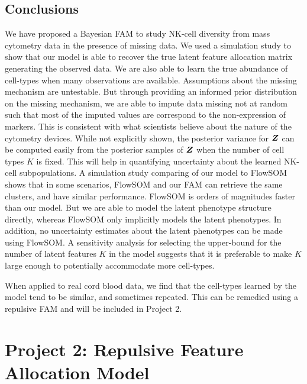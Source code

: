 \documentclass[12pt,]{article}
\newcommand{\bZ}{\mbox{\boldmath $Z$}}
\begin{document}
\subsection{Conclusions}\label{sec:CB-conc}


We have proposed a Bayesian FAM to study NK-cell diversity from mass cytometry
data in the presence of missing data. We used a simulation study to show that
our model is able to recover the true latent feature allocation matrix
generating the observed data. We are also able to learn the true abundance of
cell-types when many observations are available. 
%
Assumptions about the missing mechanism are untestable. But through providing
an informed prior distribution on the missing mechanism, we are able to impute
data missing not at random such that most of the imputed values are correspond
to the non-expression of markers. This is consistent with what scientists
believe about the nature of the cytometry devices.
%
While not explicitly shown, the posterior variance for $\bZ$ can be computed
easily from the posterior samples of $\bZ$ when the number of cell types $K$ is
fixed. This will help in quantifying uncertainty about the learned NK-cell
subpopulations. 
%
A simulation study comparing of our model to FlowSOM shows that in some
scenarios, FlowSOM and our FAM can retrieve the same clusters, and have similar
performance. FlowSOM is orders of magnitudes faster than our model.  But we are
able to model the latent phenotype structure directly, whereas FlowSOM only
implicitly models the latent phenotypes. In addition, no uncertainty estimates
about the latent phenotypes can be made using FlowSOM.
%
A sensitivity analysis for selecting the upper-bound for the number of latent
features $K$ in the model suggests that it is preferable to make $K$ large
enough to potentially accommodate more cell-types.

When applied to real cord blood data, we find that the cell-types learned by
the model tend to be similar, and sometimes repeated. This can be remedied
using a repulsive FAM and will be included in Project 2.






\section{Project 2: Repulsive Feature Allocation Model}\label{sec:proj2}
\end{document}
